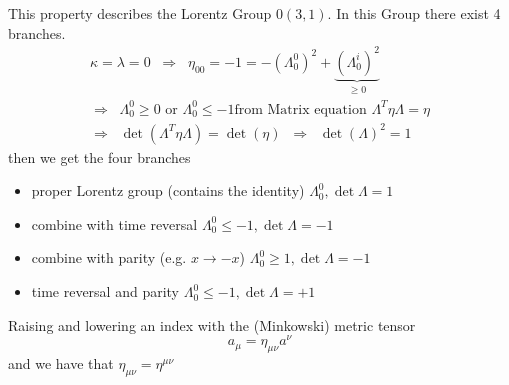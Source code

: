 \documentclass[]{scrartcl}
\begin{document}
This property describes the Lorentz Group $0(3,1)$. In this Group there exist 4 branches.
\begin{gather}
	\kappa=\lambda=0\;\;\Rightarrow\;\; \eta_{00} = -1 = -(\Lambda^0_0)^2 + \underbrace{(\Lambda^i_0)^2}_{\geq 0}\\
	\Rightarrow\;\; \Lambda^0_0 \geq 0 \text{ or } \Lambda^0_0 \leq -1
	\text{from Matrix equation } \Lambda^T \eta \Lambda = \eta\\
	\Rightarrow \;\; \det(\Lambda^T \eta\Lambda) = \det(\eta) \;\;\Rightarrow\;\; \det(\Lambda)^2 =1
\end{gather}
then we get the four branches
\begin{itemize}
	\item proper Lorentz group (contains the identity) $\Lambda^0_0,\det\Lambda = 1$
	\item combine with time reversal $\Lambda^0_0 \leq -1,\det\Lambda = -1$
	\item combine with parity (e.g. $x\rightarrow -x$) $\Lambda^0_0 \geq 1,\det\Lambda = -1$
	\item time reversal and parity $\Lambda^0_0 \leq -1,\det\Lambda = +1$
\end{itemize}
Raising and lowering an index with the (Minkowski) metric tensor
\begin{equation}
	a_\mu = \eta_{\mu\nu} a^\nu
\end{equation}
and we have that $\eta_{\mu\nu} = \eta^{\mu\nu}$
\end{document}
